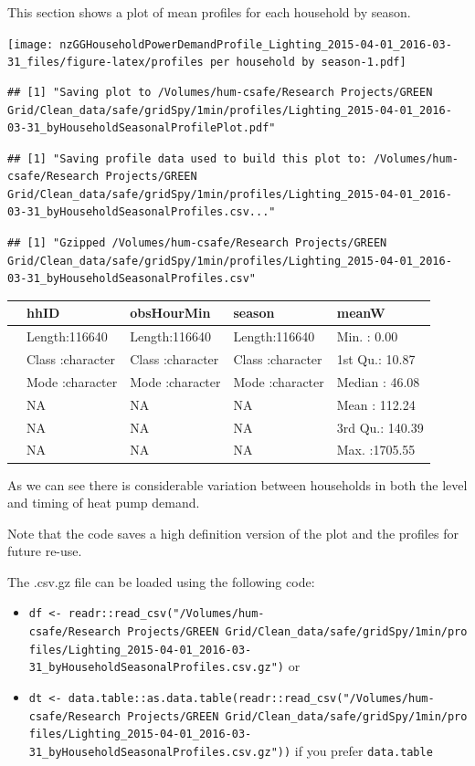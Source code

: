 \documentclass[]{article}
\providecommand{\tightlist}{%
  \setlength{\itemsep}{0pt}\setlength{\parskip}{0pt}}
\begin{document}
This section shows a plot of mean profiles for each household by season.

\texttt{[image: nzGGHouseholdPowerDemandProfile\_Lighting\_2015-04-01\_2016-03-31\_files/figure-latex/profiles per household by season-1.pdf]}

\begin{verbatim}
## [1] "Saving plot to /Volumes/hum-csafe/Research Projects/GREEN Grid/Clean_data/safe/gridSpy/1min/profiles/Lighting_2015-04-01_2016-03-31_byHouseholdSeasonalProfilePlot.pdf"
\end{verbatim}

\begin{verbatim}
## [1] "Saving profile data used to build this plot to: /Volumes/hum-csafe/Research Projects/GREEN Grid/Clean_data/safe/gridSpy/1min/profiles/Lighting_2015-04-01_2016-03-31_byHouseholdSeasonalProfiles.csv..."
\end{verbatim}

\begin{verbatim}
## [1] "Gzipped /Volumes/hum-csafe/Research Projects/GREEN Grid/Clean_data/safe/gridSpy/1min/profiles/Lighting_2015-04-01_2016-03-31_byHouseholdSeasonalProfiles.csv"
\end{verbatim}

\begin{longtable}[]{@{}lllll@{}}
\toprule
& hhID & obsHourMin & season & meanW\tabularnewline
\midrule
\endhead
& Length:116640 & Length:116640 & Length:116640 & Min. :
0.00\tabularnewline
& Class :character & Class :character & Class :character & 1st Qu.:
10.87\tabularnewline
& Mode :character & Mode :character & Mode :character & Median :
46.08\tabularnewline
& NA & NA & NA & Mean : 112.24\tabularnewline
& NA & NA & NA & 3rd Qu.: 140.39\tabularnewline
& NA & NA & NA & Max. :1705.55\tabularnewline
\bottomrule
\end{longtable}

As we can see there is considerable variation between households in both
the level and timing of heat pump demand.

Note that the code saves a high definition version of the plot and the
profiles for future re-use.

The .csv.gz file can be loaded using the following code:

\begin{itemize}
\tightlist
\item
  \texttt{df\ \textless{}-\ readr::read\_csv("/Volumes/hum-csafe/Research\ Projects/GREEN\ Grid/Clean\_data/safe/gridSpy/1min/profiles/Lighting\_2015-04-01\_2016-03-31\_byHouseholdSeasonalProfiles.csv.gz")}
  or
\item
  \texttt{dt\ \textless{}-\ data.table::as.data.table(readr::read\_csv("/Volumes/hum-csafe/Research\ Projects/GREEN\ Grid/Clean\_data/safe/gridSpy/1min/profiles/Lighting\_2015-04-01\_2016-03-31\_byHouseholdSeasonalProfiles.csv.gz"))}
  if you prefer \texttt{data.table}
\end{itemize}
\end{document}
